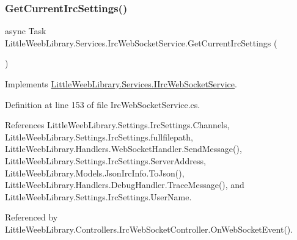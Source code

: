 \subsubsection{\texorpdfstring{Get\+Current\+Irc\+Settings()}{GetCurrentIrcSettings()}}
{\footnotesize\ttfamily async Task Little\+Weeb\+Library.\+Services.\+Irc\+Web\+Socket\+Service.\+Get\+Current\+Irc\+Settings (\begin{DoxyParamCaption}{ }\end{DoxyParamCaption})}



Implements \mbox{\hyperlink{interface_little_weeb_library_1_1_services_1_1_i_irc_web_socket_service_abcd6f0217a73e1533c3b3fc8160b54fa}{Little\+Weeb\+Library.\+Services.\+I\+Irc\+Web\+Socket\+Service}}.



Definition at line 153 of file Irc\+Web\+Socket\+Service.\+cs.



References Little\+Weeb\+Library.\+Settings.\+Irc\+Settings.\+Channels, Little\+Weeb\+Library.\+Settings.\+Irc\+Settings.\+fullfilepath, Little\+Weeb\+Library.\+Handlers.\+Web\+Socket\+Handler.\+Send\+Message(), Little\+Weeb\+Library.\+Settings.\+Irc\+Settings.\+Server\+Address, Little\+Weeb\+Library.\+Models.\+Json\+Irc\+Info.\+To\+Json(), Little\+Weeb\+Library.\+Handlers.\+Debug\+Handler.\+Trace\+Message(), and Little\+Weeb\+Library.\+Settings.\+Irc\+Settings.\+User\+Name.



Referenced by Little\+Weeb\+Library.\+Controllers.\+Irc\+Web\+Socket\+Controller.\+On\+Web\+Socket\+Event().


